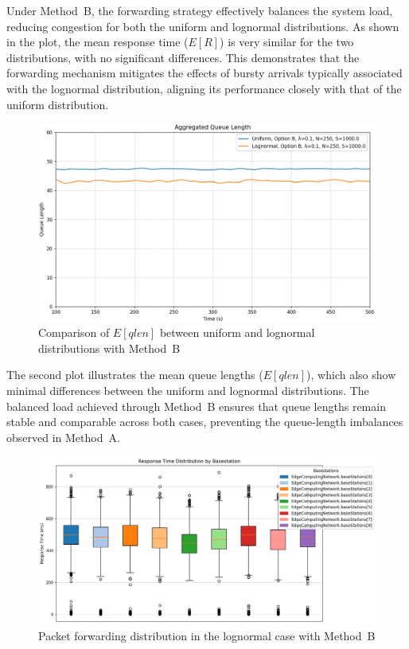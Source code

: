 \documentclass{report}
\begin{document}
Under Method~B, the forwarding strategy effectively balances the system load, reducing congestion for both the uniform and lognormal distributions. As shown in the plot, the mean response time ($E[R]$) is very similar for the two distributions, with no significant differences. This demonstrates that the forwarding mechanism mitigates the effects of bursty arrivals typically associated with the lognormal distribution, aligning its performance closely with that of the uniform distribution.

\begin{figure}[H]
    \centering
    \includegraphics[width=\textwidth]{img/plots/I-vary/Q_B_I01.png}
    \caption{Comparison of $E[qlen]$ between uniform and lognormal distributions with Method~B}
\end{figure}

\begin{flushleft}
The second plot illustrates the mean queue lengths ($E[qlen]$), which also show minimal differences between the uniform and lognormal distributions. The balanced load achieved through Method~B ensures that queue lengths remain stable and comparable across both cases, preventing the queue-length imbalances observed in Method~A.
\end{flushleft}

\begin{figure}[H]
    \centering
    \includegraphics[width=\textwidth]{img/plots/I-vary/Q_Box_Log_B_I01.png}
    \caption{Packet forwarding distribution in the lognormal case with Method~B}
\end{figure}
\end{document}
